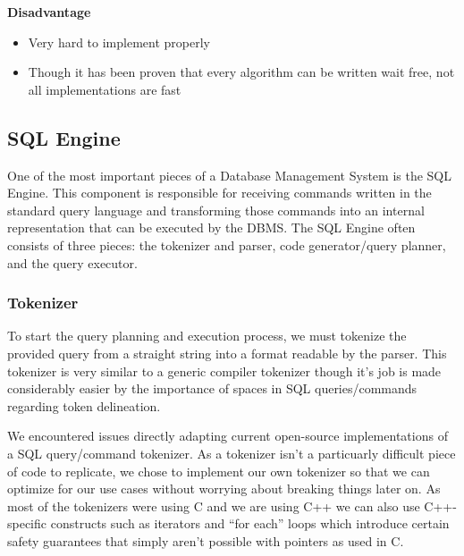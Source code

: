 \documentclass[letterpaper, 11pt]{article}
\begin{document}
{\bfseries Disadvantage}
\par\vspace{\baselineskip}
\begin{itemize}
	\item Very hard to implement properly
	\item Though it has been proven that every algorithm can be written wait free, not all implementations are fast
\end{itemize}

\newpage
\subsection{SQL Engine}
One of the most important pieces of a Database Management System is the SQL Engine.
This component is responsible for receiving commands written in the standard query
language and transforming those commands into an internal representation that can be
executed by the DBMS. The SQL Engine often consists of three pieces: the tokenizer and
parser, code generator/query planner, and the query executor.

\subsubsection{Tokenizer}
To start the query planning and execution process, we must tokenize the provided query
from a straight string into a format readable by the parser. This tokenizer is very
similar to a generic compiler tokenizer though it's job is made considerably easier
by the importance of spaces in SQL queries/commands regarding token delineation.
\par\vspace{\baselineskip}
We encountered issues directly adapting current open-source implementations of a
SQL query/command tokenizer. As a tokenizer isn't a particuarly difficult piece of
code to replicate, we chose to implement our own tokenizer so that
we can optimize for our use cases without worrying about breaking things later on.
As most of the tokenizers were using C and we are using C++ we can also use C++-specific
constructs such as iterators and ``for each'' loops which introduce certain safety guarantees
that simply aren't possible with pointers as used in C.
\end{document}
